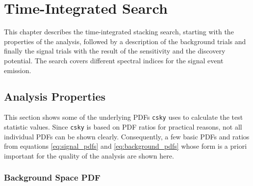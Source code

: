 \chapter{Time-Integrated Search} \label{sec:csky_time_int}

This chapter describes the time-integrated stacking search, starting with the properties of the analysis, followed by a description of the background trials and finally the signal trials with the result of the sensitivity and the discovery potential.
The search covers different spectral indices for the signal event emission.

\section{Analysis Properties}

This section shows some of the underlying PDFs \texttt{csky} uses to calculate the test statistic values.
Since \texttt{csky} is based on PDF ratios for practical reasons, not all individual PDFs can be shown clearly.
Consequently, a few basic PDFs and ratios from equations \eqref{eq:signal_pdfs} and \eqref{eq:background_pdfs} whose form is a priori important for the quality of the analysis are shown here.

\subsection{Background Space PDF}


